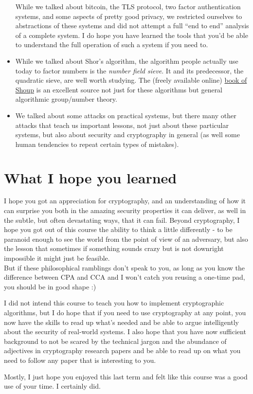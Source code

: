 \begin{itemize}
  While we talked about bitcoin, the TLS protocol, two factor
  authentication systems, and some aspects of pretty good privacy, we
  restricted ourselves to abstractions of these systems and did not
  attempt a full ``end to end'' analysis of a complete system. I do hope
  you have learned the tools that you'd be able to understand the full
  operation of such a system if you need to.
\item
  While we talked about Shor's algorithm, the algorithm people actually
  use today to factor numbers is the \emph{number field sieve}. It and
  its predecessor, the quadratic sieve, are well worth studying. The
  (freely available online) \href{http://www.shoup.net/ntb/}{book of
  Shoup} is an excellent source not just for these algorithms but
  general algorithmic group/number theory.
\item
  We talked about some attacks on practical systems, but there many
  other attacks that teach us important lessons, not just about these
  particular systems, but also about security and cryptography in
  general (as well some human tendencies to repeat certain types of
  mistakes).
\end{itemize}

\section{What I hope you learned}\label{26-What-I-hope-you-learne}

I hope you got an appreciation for cryptography, and an understanding of
how it can surprise you both in the amazing security properties it can
deliver, as well in the subtle, but often devastating ways, that it can
fail. Beyond cryptography, I hope you got out of this course the ability
to think a little differently - to be paranoid enough to see the world
from the point of view of an adversary, but also the lesson that
sometimes if something sounds crazy but is not downright impossible it
might just be feasible.\\
But if these philosophical ramblings don't speak to you, as long as you
know the difference between CPA and CCA and I won't catch you reusing a
one-time pad, you should be in good shape :)

I did not intend this course to teach you how to implement cryptographic
algorithms, but I do hope that if you need to use cryptography at any
point, you now have the skills to read up what's needed and be able to
argue intelligently about the security of real-world systems. I also
hope that you have now sufficient background to not be scared by the
technical jargon and the abundance of adjectives in cryptography
research papers and be able to read up on what you need to follow any
paper that is interesting to you.

Mostly, I just hope you enjoyed this last term and felt like this course
was a good use of your time. I certainly did.
